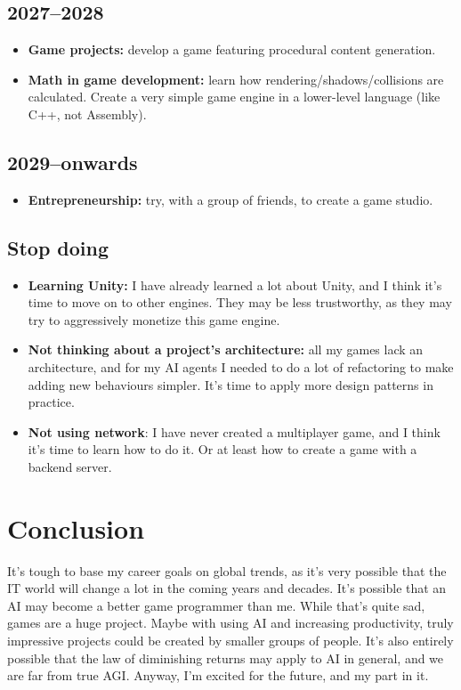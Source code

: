 \documentclass{article}
\begin{document}
\subsection{2027--2028}
\begin{itemize}
    \item \textbf{Game projects:} develop a game featuring procedural content generation.
    \item \textbf{Math in game development:} learn how rendering/shadows/collisions are calculated. Create a very simple game engine in a lower-level language (like C++, not Assembly).
\end{itemize}

\subsection{2029--onwards}
\begin{itemize}
    \item \textbf{Entrepreneurship:} try, with a group of friends, to create a game studio.
\end{itemize}

\subsection{Stop doing}
\begin{itemize}
    \item \textbf{Learning Unity:} I have already learned a lot about Unity, and I think it's time to move on to other engines. They may be less trustworthy, as they may try to aggressively monetize this game engine.
    \item \textbf{Not thinking about a project's architecture:} all my games lack an architecture, and for my AI agents I needed to do a lot of refactoring to make adding new behaviours simpler. It's time to apply more design patterns in practice.
    \item \textbf{Not using network}: I have never created a multiplayer game, and I think it's time to learn how to do it. Or at least how to create a game with a backend server.
\end{itemize}

\section{Conclusion}
It's tough to base my career goals on global trends, as it's very possible that the IT world will change a lot in the coming years and decades. It's possible that an AI may become a better game programmer than me. While that's quite sad, games are a huge project. Maybe with using AI and increasing productivity, truly impressive projects could be created by smaller groups of people. It's also entirely possible that the law of diminishing returns may apply to AI in general, and we are far from true AGI. Anyway, I'm excited for the future, and my part in it.

\printbibliography
\end{document}
